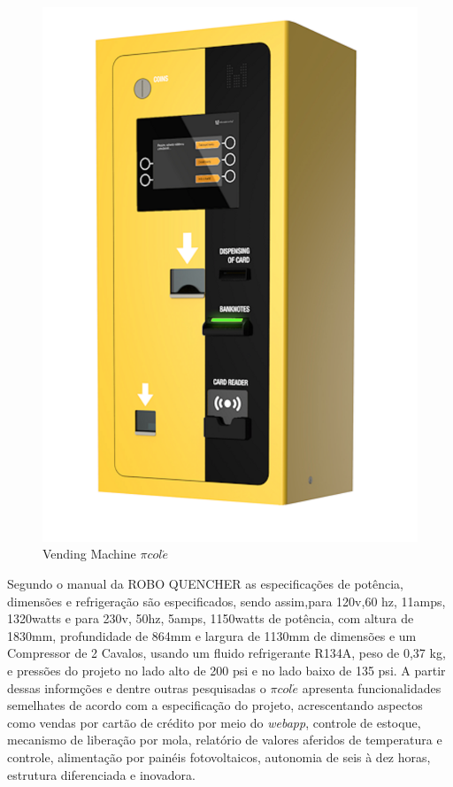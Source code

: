 \begin{figure}[H]
	\centering
    \includegraphics[scale=0.8]{figuras/vending_machine}
    \caption{Vending Machine $\pi col\acute{e}$}
    \label{fig:vending_machine}
\end{figure}

Segundo o manual da ROBO QUENCHER as especificações de potência, dimensões e refrigeração são especificados, sendo assim,para 120v,60 hz, 11amps, 1320watts e para  230v, 50hz, 5amps, 1150watts de potência, com altura de 1830mm, profundidade de 864mm e largura de 1130mm de dimensões e um Compressor de 2 Cavalos, usando um fluido refrigerante R134A, peso de 0,37 kg, e pressões do projeto no lado alto de 200 psi e no lado baixo de 135 psi. A partir dessas informções e dentre outras pesquisadas o $\pi col\acute{e}$ apresenta funcionalidades semelhates de acordo com a especificação do projeto, acrescentando aspectos como vendas por cartão de crédito por meio do  \textit{webapp}, controle de estoque, mecanismo de liberação por mola, relatório de valores aferidos de temperatura e controle, alimentação por painéis fotovoltaicos, autonomia de seis à dez horas, estrutura diferenciada e inovadora.
 \cite{ROBOQUENCHER}



